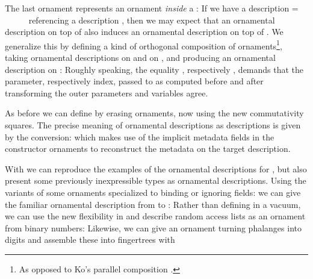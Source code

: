 The last ornament represents an ornament \emph{inside} a : If we have a description  = \ \ \ \ \  referencing a description , then we may expect that an ornamental description on top of  also induces an ornamental description on top of . We generalize this by defining a kind of orthogonal composition of ornaments\footnote{As opposed to Ko's parallel composition \cite{ko}.}, taking ornamental descriptions  on  and  on , and producing an ornamental description on :
Roughly speaking, the equality , respectively , demands that the parameter, respectively index, passed to  as computed before and after transforming the outer parameters and variables agree.

As before we can define  by erasing ornaments, now using the new commutativity squares. The precise meaning of ornamental descriptions as descriptions is given by the conversion:
which makes use of the implicit metadata fields in the constructor ornaments to reconstruct the metadata on the target description.

With  we can reproduce the examples of the ornamental descriptions for , but also present some previously inexpressible types as ornamental descriptions. Using the variants of some ornaments specialized to binding or ignoring fields:
we can give the familiar ornamental description from  to :
Rather than defining  in a vacuum, we can use the new flexibility in  and describe random access lists as an ornament from binary numbers:
Likewise, we can give an ornament turning phalanges into digits
and assemble these into fingertrees with 
